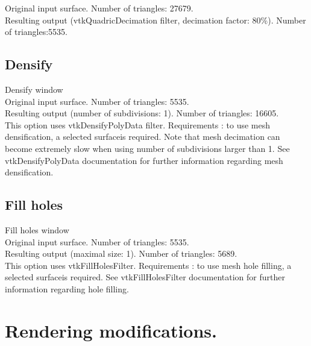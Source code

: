 Original input surface. Number of triangles: 27679.\\
Resulting output (vtkQuadricDecimation filter,
decimation factor: 80\%). Number of triangles:5535.

\subsection{Densify}
Densify window\\
Original input surface. Number of triangles: 5535.\\

Resulting output (number of subdivisions: 1). Number of triangles: 16605.\\


This option uses vtkDensifyPolyData filter.
Requirements : to use mesh densification, a selected
surfaceis required.
Note that mesh decimation can become extremely slow
when using number of subdivisions larger than 1.
See vtkDensifyPolyData documentation for further information regarding mesh densification.

\subsection{Fill holes}
Fill holes window\\
Original input surface. Number of triangles: 5535. \\
Resulting output (maximal size: 1). Number of triangles: 5689.\\


This option uses vtkFillHolesFilter.
Requirements : to use mesh hole filling, a selected surfaceis
required. See vtkFillHolesFilter documentation for further
information regarding hole filling.


\section{Rendering modifications.}
